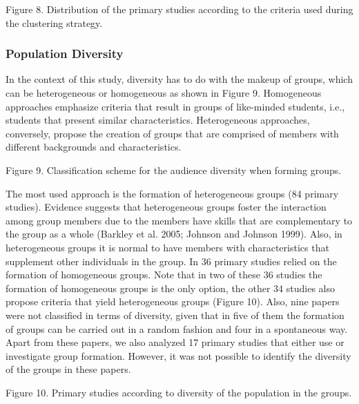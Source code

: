 Figure 8. Distribution of the primary studies according to the criteria used during the clustering strategy.

\subsubsection{Population Diversity}

In the context of this study, diversity has to do with the makeup of groups, which can be heterogeneous or homogeneous as shown in Figure 9. Homogeneous approaches emphasize criteria that result in groups of like-minded students, i.e., students that present similar characteristics. Heterogeneous approaches, conversely, propose the creation of groups that are comprised of members with different backgrounds and characteristics. 

Figure 9. Classification scheme for the audience diversity when forming groups.

The most used approach is the formation of heterogeneous groups (84 primary studies). Evidence suggests that heterogeneous groups foster the interaction among group members due to the members have skills that are complementary to the group as a whole (Barkley et al. 2005; Johnson and Johnson 1999). Also, in heterogeneous groups it is normal to have members with characteristics that supplement other individuals in the group. 
In 36 primary studies relied on the formation of homogeneous groups. Note that in two of these 36 studies the formation of homogeneous groups is the only option, the other 34 studies also propose criteria that yield heterogeneous groups (Figure 10). Also, nine papers were not classified in terms of diversity, given that in five of them the formation of groups can be carried out in a random fashion and four in a spontaneous way. Apart from these papers, we also analyzed 17 primary studies that either use or investigate group formation. However, it was not possible to identify the diversity of the groups in these papers.

Figure 10. Primary studies according to diversity of the population in the groups.

